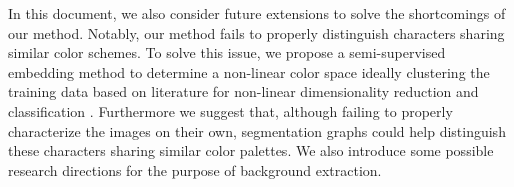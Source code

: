 In this document, we also consider future extensions to solve the shortcomings of our method. Notably, our method fails to properly distinguish characters sharing similar color schemes. To solve this issue, we propose a semi-supervised embedding method to determine a non-linear color space ideally clustering the training data based on literature for non-linear dimensionality reduction \cite{roweis2000nonlinear} \cite{belkin2003laplacian} and classification \cite{urahama2007semi}. Furthermore we suggest that, although failing to properly characterize the images on their own, segmentation graphs could help distinguish these characters sharing similar color palettes. We also introduce some possible research directions for the purpose of background extraction.
